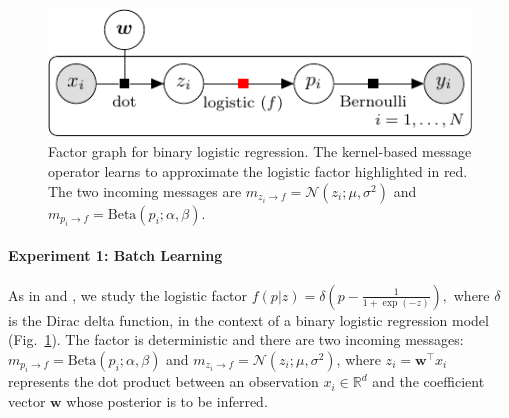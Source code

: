 \documentclass[english]{article}
\theoremstyle{plain}
\theoremstyle{plain}
\newcommand{\factor}{f}				%
\newcommand{\msg}[2]{m_{#1 \rightarrow #2}}			%
\newcommand{\figref}[1]{Fig.~\ref{#1}}
\begin{document}
\begin{figure}[ht]
\centering
\includegraphics[width=0.8\columnwidth]{img/binary_logistic_regression-crop}
%  
%  
\caption{Factor graph for binary logistic regression. 
The kernel-based message operator learns to approximate the logistic factor 
highlighted in red. The two incoming messages are 
$\msg{z_i}{\factor} = \mathcal{N}(z_i; \mu, \sigma^2)$ and 
$\msg{p_i}{\factor} = \text{Beta}(p_i; \alpha, \beta) $. 
}
\label{fig:factor_graph_binlog}
\end{figure}


\paragraph{Experiment 1: Batch Learning} 
As in \citet{Heess2013} and \citet{Eslami2014}, we study the logistic factor 
$\factor(p|z)=\delta\left(p-\frac{1}{1+\exp(-z)}\right),$ 
%
%
where $\delta$ is the Dirac delta function, in the context of 
a binary logistic regression model  (\figref{fig:factor_graph_binlog}).
The factor is deterministic and there are two incoming messages: 
$\msg{p_i}{\factor} = \text{Beta}(p_i; \alpha, \beta) $ and 
$\msg{z_i}{\factor} = \mathcal{N}(z_i; \mu, \sigma^2)$, 
where $z_i = \boldsymbol{w}^\top x_i$ represents the dot product between an observation 
$x_i \in \mathbb{R}^d$ and the coefficient vector $\boldsymbol{w}$ whose posterior is 
to be inferred.
\end{document}
